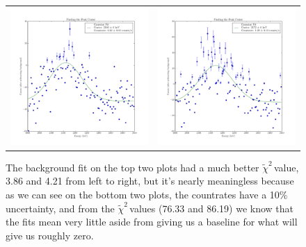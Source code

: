 \documentclass{article}
\newcommand{\redchi}{$\tilde{\chi}^2\,$}
\begin{document}
\begin{figure}[!htb]
\begin{tabular}{c c}
      \includegraphics[scale=.4]{../plots/peak_center_lead_portclosed.pdf} & \includegraphics[scale=.4]{../plots/peak_center_lead_portopen.pdf} \\
    \end{tabular}
    \caption{The background fit on the top two plots had a much better \redchi value, 3.86 and 4.21 from left to right, but it's nearly meaningless because as we can see on the bottom two plots, the countrates have a 10\% uncertainty, and from the \redchi values (76.33 and 86.19) we know that the fits mean very little aside from giving us a baseline for what will give us roughly zero.}
    \label{lead}
  \end{figure}
\end{document}
